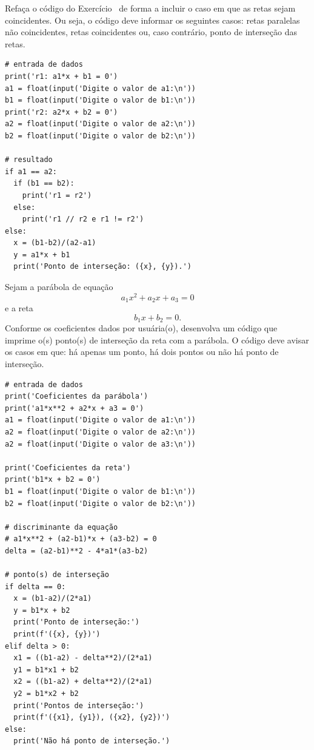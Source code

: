 \begin{exer}
  Refaça o código do Exercício~ de forma a incluir o caso em que as retas sejam coincidentes. Ou seja, o código deve informar os seguintes casos: retas paralelas não coincidentes, retas coincidentes ou, caso contrário, ponto de interseção das retas.
\end{exer}
\begin{resp}

\begin{lstlisting}
# entrada de dados
print('r1: a1*x + b1 = 0')
a1 = float(input('Digite o valor de a1:\n'))
b1 = float(input('Digite o valor de b1:\n'))
print('r2: a2*x + b2 = 0')
a2 = float(input('Digite o valor de a2:\n'))
b2 = float(input('Digite o valor de b2:\n'))

# resultado
if a1 == a2:
  if (b1 == b2):
    print('r1 = r2')
  else:
    print('r1 // r2 e r1 != r2')
else:
  x = (b1-b2)/(a2-a1)
  y = a1*x + b1
  print('Ponto de interseção: ({x}, {y}).')
\end{lstlisting}

\end{resp}

\begin{exer}
  Sejam a parábola de equação
  \begin{equation}
    a_1x^2 + a_2x + a_3 = 0
  \end{equation}
  e a reta
  \begin{equation}
    b_1x + b_2 = 0.
  \end{equation}
  Conforme os coeficientes dados por usuária(o), desenvolva um código que imprime o(s) ponto(s) de interseção da reta com a parábola. O código deve avisar os casos em que: há apenas um ponto, há dois pontos ou não há ponto de interseção.
\end{exer}
\begin{resp}

\begin{lstlisting}
# entrada de dados
print('Coeficientes da parábola')
print('a1*x**2 + a2*x + a3 = 0')
a1 = float(input('Digite o valor de a1:\n'))
a2 = float(input('Digite o valor de a2:\n'))
a2 = float(input('Digite o valor de a3:\n'))

print('Coeficientes da reta')
print('b1*x + b2 = 0')
b1 = float(input('Digite o valor de b1:\n'))
b2 = float(input('Digite o valor de b2:\n'))

# discriminante da equação
# a1*x**2 + (a2-b1)*x + (a3-b2) = 0
delta = (a2-b1)**2 - 4*a1*(a3-b2)

# ponto(s) de interseção
if delta == 0:
  x = (b1-a2)/(2*a1)
  y = b1*x + b2
  print('Ponto de interseção:')
  print(f'({x}, {y})')
elif delta > 0:
  x1 = ((b1-a2) - delta**2)/(2*a1)
  y1 = b1*x1 + b2
  x2 = ((b1-a2) + delta**2)/(2*a1)
  y2 = b1*x2 + b2
  print('Pontos de interseção:')
  print(f'({x1}, {y1}), ({x2}, {y2})')
else:
  print('Não há ponto de interseção.')
\end{lstlisting}

\end{resp}

